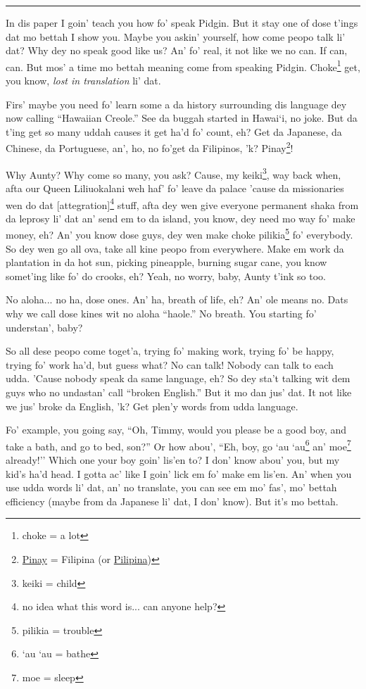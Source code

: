 \documentclass[12pt]{article}%
\begin{document}
\vspace{5mm}
\hrule

\begin{multicols}{2}
In dis paper I goin' teach you how fo' speak Pidgin. But it stay one of dose t'ings dat mo bettah I show you. Maybe you askin' yourself, how come peopo talk li' dat? Why dey no speak good like us? An' fo' real, it not like we no can. If can, can. But mos' a time mo bettah meaning come from speaking Pidgin. Choke\footnote{choke = a lot} get, you know, {\em lost in translation} li' dat.

Firs' maybe you need fo' learn some a da history surrounding dis language dey now calling ``Hawaiian Creole.'' See da buggah started in Hawai`i, no joke. But da t'ing get so many uddah causes it get ha'd fo' count, eh? Get da Japanese, da Chinese, da Portuguese, an', ho, no fo'get da Filipinos, 'k? Pinay\footnote{\href{http://en.wikipedia.org/wiki/Pinoy}{Pinay} = Filipina (or \href{http://globalnation.inquirer.net/80871/why-filipino-americans-say-pilipino-not-filipino/}{Pilipina})}!

Why Aunty? Why come so many, you ask? Cause, my keiki\footnote{keiki = child}, way back when, afta our Queen Liliuokalani weh haf' fo' leave da palace 'cause da missionaries wen do dat [attegration]\footnote{no idea what this word is... can anyone help?} stuff, afta dey wen give everyone permanent shaka from da leprosy li' dat an' send em to da island, you know, dey need mo way fo' make money, eh? An' you know dose guys, dey wen make choke pilikia\footnote{pilikia = trouble} fo' everybody. So dey wen go all ova, take all kine peopo from everywhere. Make em work da plantation in da hot sun, picking pineapple, burning sugar cane, you know somet'ing like fo' do crooks, eh? Yeah, no worry, baby, Aunty t'ink so too. 

No aloha... no ha, dose ones. An' ha, breath of life, eh? An' ole means no. Dats why we call dose kines wit no aloha ``haole.'' No breath. You starting fo' understan', baby?

So all dese peopo come toget'a, trying fo' making work, trying fo' be happy, trying fo' work ha'd, but guess what? No can talk! Nobody can talk to each udda. 'Cause nobody speak da same language, eh? So dey sta't talking wit dem guys who no undastan' call ``broken English.'' But it mo dan jus' dat. It not like we jus' broke da English, 'k? Get plen'y words from udda language. 

Fo' example, you going say, ``Oh, Timmy, would you please be a good boy, and take a bath, and go to bed, son?'' Or how abou', ``Eh, boy, go `au `au\footnote{`au `au = bathe} an' moe\footnote{moe = sleep} already!'' Which one your boy goin' lis'en to? I don' know abou' you, but my kid's ha'd head. I gotta ac' like I goin' lick em fo' make em lis'en. An' when you use udda words li' dat, an' no translate, you can see em mo' fas', mo' bettah efficiency (maybe from da Japanese li' dat, I don' know). But it's mo bettah.


\end{multicols}
\end{document}
